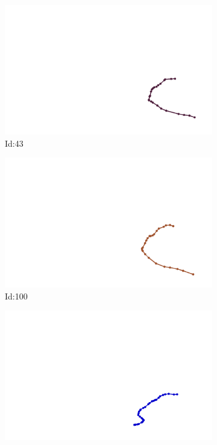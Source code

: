 \documentclass[12pt,twoside]{report}
\begin{document}
\begin{figure}
\centering
\begin{subfigure}[b]{0.20\textwidth}
\centering
\includegraphics[width=\textwidth]{../../trajectories/43.png}
\caption{Id:43}
\end{subfigure}
\begin{subfigure}[b]{0.20\textwidth}
\centering
\includegraphics[width=\textwidth]{../../trajectories/100.png}
\caption{Id:100}
\end{subfigure}
\begin{subfigure}[b]{0.20\textwidth}
\centering
\includegraphics[width=\textwidth]{../../trajectories/109.png}

\end{subfigure}
\end{figure}
\end{document}
